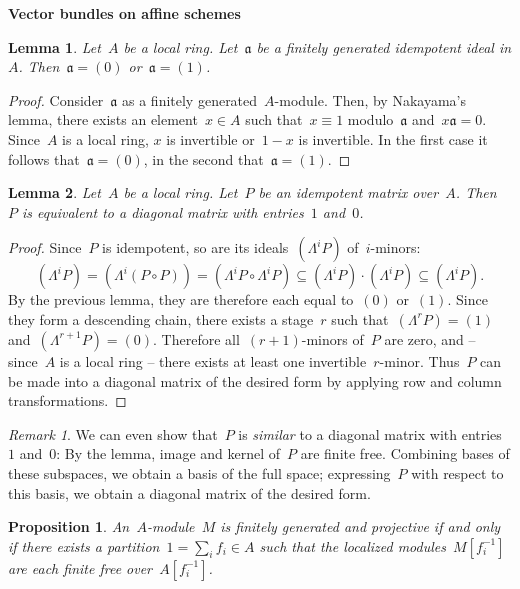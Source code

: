 \documentclass[12pt]{scrartcl}
\theoremstyle{definition}
\theoremstyle{plain}
\newtheorem*{prop}{Proposition}
\newtheorem*{lemma}{Lemma}
\theoremstyle{remark}
\newtheorem*{rem}{Remark}
\newcommand{\aaa}{\mathfrak{a}}
\begin{document}
\enlargethispage{4em}

\begin{center}\huge\textbf{\textsf{Vector bundles on affine schemes}}\end{center}
\bigskip

\begin{lemma}Let~$A$ be a local ring. Let~$\aaa$ be a finitely generated
idempotent ideal in $A$. Then~$\aaa = (0)$ or~$\aaa = (1)$.
\end{lemma}

\begin{proof}Consider~$\aaa$ as a finitely generated~$A$-module. Then, by
Nakayama's lemma, there exists an element~$x \in A$ such that~$x \equiv 1$
modulo~$\aaa$ and~$x \aaa = 0$. Since~$A$ is a local ring, $x$ is invertible
or~$1-x$ is invertible. In the first case it follows that~$\aaa = (0)$, in the
second that~$\aaa = (1)$.
\end{proof}

\begin{lemma}Let~$A$ be a local ring. Let~$P$ be an idempotent matrix over~$A$.
Then~$P$ is equivalent to a diagonal matrix with entries~$1$ and~$0$.
\end{lemma}

\begin{proof}Since~$P$ is idempotent, so are its ideals~$(\Lambda^i P)$
of~$i$-minors:
\[ (\Lambda^i P) = (\Lambda^i (P \circ P)) =
(\Lambda^i P \circ \Lambda^i P) \subseteq (\Lambda^i P) \cdot (\Lambda^i P)
\subseteq (\Lambda^i P). \]
By the previous lemma, they are therefore each equal to~$(0)$ or~$(1)$. Since
they form a descending chain, there exists a stage~$r$ such that~$(\Lambda^r P)
= (1)$ and~$(\Lambda^{r+1} P) = (0)$. Therefore all~$(r+1)$-minors of~$P$ are
zero, and -- since~$A$ is a local ring -- there exists at least one
invertible~$r$-minor. Thus~$P$ can be made into a diagonal matrix of the
desired form by applying row and column transformations.
\end{proof}

\begin{rem}We can even show that~$P$ is \emph{similar} to a diagonal matrix
with entries~$1$ and~$0$: By the lemma, image and kernel of~$P$ are finite
free. Combining bases of these subspaces, we obtain a basis of the full space;
expressing~$P$ with respect to this basis, we obtain a diagonal matrix of the
desired form.\end{rem}

\begin{prop}An~$A$-module~$M$ is finitely generated and projective if and only
if there exists a partition~$1 = \sum_i f_i \in A$ such that the localized
modules~$M[f_i^{-1}]$ are each finite free over~$A[f_i^{-1}]$.\end{prop}
\end{document}
